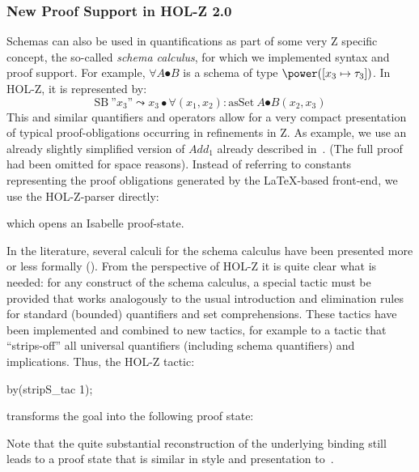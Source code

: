 {\subsubsection{New Proof Support in HOL-Z 2.0}
Schemas can also be used in quantifications as part of some very Z specific
concept, the so-called \emph{schema calculus}, for which we implemented syntax 
and proof support. For
example, $\forall A \spot B$ is a schema of type $\power ([x_3 \bindsto
\tau_3])$. In HOL-Z, it is represented by:
\[ 
  \mathrm{SB}~\mbox{''$x_3$''} \leadsto x_3\bullet \forall (x_1,x_2) :
  \mathrm{asSet}~A \spot B(x_2,x_3) 
\]
This and similar quantifiers and operators allow for a very compact presentation
of typical proof-obligations occurring in refinements in Z. As example, we use 
an already slightly simplified version of $Add_1$ already described 
in~\cite[pp. 138]{spivey:z_notation:1992}. (The full proof had been omitted 
for space reasons). Instead of referring to constants representing the proof 
obligations generated by the \LaTeX-based front-end, we use the HOL-Z-parser directly:
which opens an Isabelle proof-state.

In the literature, several calculi for the schema calculus have been presented
more or less formally (\cite{iso:z:2000,henson.ea:logic:1998}). From the
perspective of HOL-Z it is quite clear what is needed: for any construct of the
schema calculus, a special tactic must be provided that works analogously to the
usual introduction and elimination rules for standard (bounded) quantifiers and
set comprehensions. These tactics have been implemented and combined to new
tactics, for example to a tactic that ``strips-off'' all universal quantifiers
(including schema quantifiers) and implications. Thus, the HOL-Z tactic:
\begin{holzverb}
   by(stripS_tac 1);
\end{holzverb}
transforms the goal into the following proof state:
Note that the quite substantial reconstruction of the underlying binding still
leads to a proof state that is similar in style and presentation
to~\cite{woodcock.ea:using:1996}.

}
